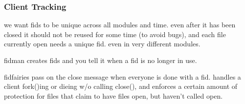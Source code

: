 \subsubsection{Client Tracking}

we want fids to be unique across all modules and time. even after it
has been closed it should not be reused for some time (to avoid bugs),
and each file currently open needs a unique fid. even in very
different modules.

fidman creates fids and you tell it when a fid is no longer in use.

fidfairies pass on the close message when everyone is done with a
fid. handles a client fork()ing or dieing w/o calling close(), and
enforces a certain amount of protection for files that claim to have
files open, but haven't called open.
